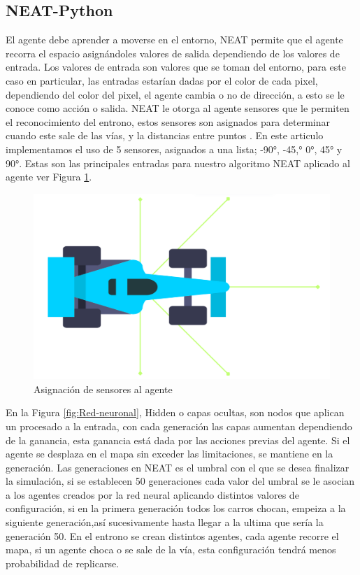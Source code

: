 \documentclass[lettersize, journal]{IEEEtran}
\begin{document}
\subsection{NEAT-Python}
El agente debe aprender a moverse en el entorno, NEAT permite que el agente recorra el espacio asignándoles valores de salida dependiendo de los valores de entrada. Los valores de entrada son valores que se toman del entorno, para este caso en particular, las entradas estarían dadas por el color de cada pixel, dependiendo del color del pixel, el agente cambia o no de dirección,  a esto se le conoce como acción o salida. NEAT le otorga al agente sensores que le permiten el reconocimiento del entrono, estos sensores son asignados para determinar cuando este sale de las vías, y la distancias entre puntos \cite{sensores}. En este articulo implementamos el uso de 5 sensores, asignados a una lista; -90°, -45,° 0°, 45° y 90°. Estas son las principales entradas para nuestro algoritmo NEAT aplicado al agente ver Figura \ref{fig:agente_sensores}.

\begin{figure}[H]
    \centering
    \includegraphics[width=0.4\linewidth]{images/sensores.png}
    \caption{Asignación de sensores al agente}
    \label{fig:agente_sensores}
\end{figure}

En la Figura \ref{fig:Red-neuronal},  Hidden o capas ocultas, son nodos que aplican un procesado a la entrada, con cada generación las capas aumentan dependiendo de la ganancia, esta ganancia está dada por las acciones previas del agente. Si el agente se desplaza en el mapa sin exceder las limitaciones, se mantiene en la generación. Las generaciones en NEAT es el umbral con el que se desea finalizar la simulación, si se establecen 50 generaciones cada valor del umbral se le asocian a los agentes creados por la red neural aplicando distintos valores de configuración, si en la primera generación todos los carros chocan, empeiza a la siguiente generación,así sucesivamente hasta llegar a la ultima que sería la generación 50. En el entrono se crean distintos agentes, cada agente recorre el mapa, si un agente choca o se sale de la vía, esta configuración tendrá menos probabilidad de replicarse.
\end{document}
